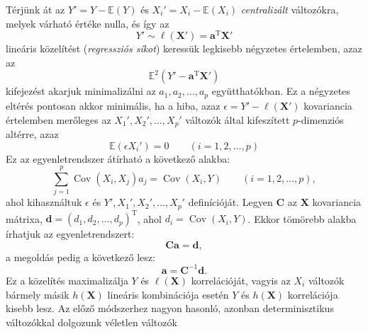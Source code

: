\documentclass[%
	DIV=15,appendixprefix]{scrreprt}
\theoremstyle{definition}
\theoremstyle{remark}
\newcommand{\mean}{\mathbb{E}}
\DeclareMathOperator{\T}{T}
\DeclareMathOperator{\Cov}{Cov}
\begin{document}
Térjünk át az $ Y' = Y - \mean \left( Y \right) $ és $X_{ i }' = X_{ i } - \mean \left( X_{ i }
\right) $ \emph{centralizált} változókra, melyek várható értéke nulla, és így az
\begin{equation*}
	Y' \sim \ell \left( \mathbf{ X }' \right) = \mathbf{ a }^{ \T } \mathbf{ X }'
\end{equation*}
lineáris közelítést (\emph{regressziós síkot}) keressük legkisebb négyzetes értelemben, azaz az
\begin{equation*}
	\mean^{ 2 } \left( Y' - \mathbf{ a }^{ \T } \mathbf{ X }' \right)
\end{equation*}
kifejezést akarjuk minimalizálni az $ a_{ 1 },{} a_{ 2 },{} \ldots,{} a_{ p } $ együtthatókban. Ez a
négyzetes eltérés pontosan akkor minimális, ha a hiba, azaz $ \epsilon = Y' - \ell \left(
\mathbf{ X }' \right) $ kovariancia értelemben merőleges az $ X_{ 1 }',{} X_{ 2 }',{} \ldots,{}
X_{ p }' $ változók által kifeszített $ p $-dimenziós altérre, azaz
\begin{equation*}
	\mean \left( \epsilon X_{ i }' \right) = 0 \qquad \left( i = 1,{} 2,{} \ldots,{} p \right)
\end{equation*}
Ez az egyenletrendszer átírható a következő alakba:
\begin{equation*}
	\sum_{ j = 1 }^{ p } \Cov \left(X_{ i },{} X_{ j } \right) a_{ j } = \Cov \left(X_{ i },{} Y
	\right) \qquad \left( i = 1,{} 2,{} \ldots,{} p \right),
\end{equation*}
ahol kihasználtuk $ \epsilon $ és $ Y',{} X_{ 1 }',{} X_{ 2 }',{} \ldots,{} X_{ p }' $ definícióját.
Legyen $ \mathbf{ C } $ az $ \mathbf{X} $ kovariancia mátrixa, $ \mathbf{ d } = \left( d_{ 1 },{}
d_{ 2 },{} \ldots,{} d_{ p } \right)^{ \T } $, ahol $ d_{ i }= \Cov \left(X_{ i },{} Y \right)$. Ekkor
tömörebb alakba írhatjuk az egyenletrendszert:
\begin{equation*}
	\mathbf{ C } \mathbf{ a } = \mathbf{ d },
\end{equation*}
a megoldás pedig a következő lesz:
\begin{equation*}
	\mathbf{ a } = \mathbf{ C }^{ - 1 } \mathbf{ d }.
\end{equation*}
Ez a közelítés maximalizálja $ Y $ és $ \ell \left( \mathbf{ X } \right) $ korrelációját, vagyis az
$ X_{ i } $ változók bármely másik $ h \left( \mathbf{ X } \right) $ lineáris kombinációja esetén
$ Y $ és $ h \left( \mathbf{ X } \right) $ korrelációja kisebb lesz.
%
Az előző módszerhez nagyon hasonló, azonban determinisztikus változókkal dolgozunk véletlen változók
\end{document}
